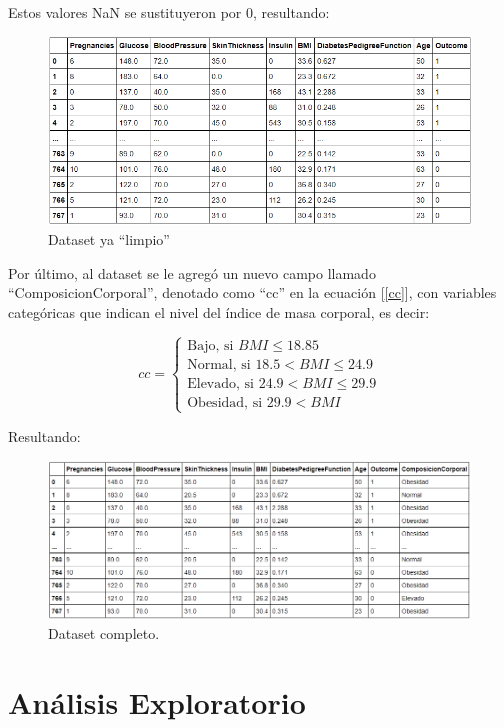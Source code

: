 \documentclass{article}
\begin{document}
Estos valores NaN se sustituyeron por $0$, resultando:

\begin{figure}[H]
	\centering
	\includegraphics[width=0.9\linewidth]{dataset_limpio.png}
	\caption{Dataset ya ``limpio''}%
	\label{fig:dataset_limpio}
\end{figure}

Por último, al dataset se le agregó un nuevo campo llamado ``ComposicionCorporal'', denotado como ``cc'' en la ecuación [\ref{cc}], con variables categóricas que indican el nivel del índice de masa corporal, es decir:

\begin{equation}\label{cc}
	cc=
	\begin{cases}
		\text{Bajo, si      } BMI \leq 18.85\\
		\text{Normal, si    } 18.5 < BMI \leq 24.9\\
		\text{Elevado, si   } 24.9 < BMI \leq 29.9\\
		\text{Obesidad, si  } 29.9 < BMI
	\end{cases}
\end{equation}

Resultando:

\begin{figure}[H]
	\centering
	\includegraphics[width=0.9\linewidth]{dataset_completo.png}
	\caption{Dataset completo.}%
	\label{fig:dataset_completo}
\end{figure}


\section{Análisis Exploratorio}
\end{document}
